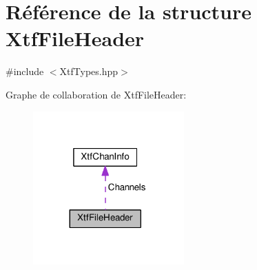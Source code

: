 \hypertarget{structXtfFileHeader}{}\section{Référence de la structure Xtf\+File\+Header}
\label{structXtfFileHeader}


{\ttfamily \#include $<$Xtf\+Types.\+hpp$>$}



Graphe de collaboration de Xtf\+File\+Header\+:
\nopagebreak
\begin{figure}[H]
\begin{center}
\leavevmode
\includegraphics[width=164pt]{structXtfFileHeader__coll__graph}
\end{center}
\end{figure}
